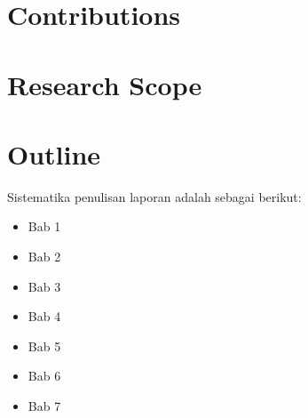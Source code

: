 \section{Contributions}

\section{Research Scope}


\section{Outline}
Sistematika penulisan laporan adalah sebagai berikut:
\begin{itemize}
	\item Bab 1 \babSatu \\
	\item Bab 2 \babDua \\
	\item Bab 3 \babTiga \\
	\item Bab 4 \babEmpat \\
	\item Bab 5 \babLima \\
	\item Bab 6 \babEnam \\
	\item Bab 7 \kesimpulan \\
\end{itemize}
